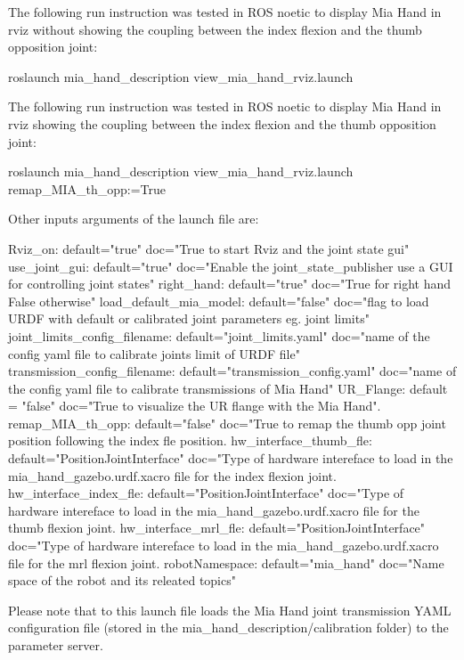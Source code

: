 The following run instruction was tested in R\+OS noetic to display Mia Hand in rviz without showing the coupling between the index flexion and the thumb opposition joint\+: \begin{DoxyVerb}roslaunch mia_hand_description view_mia_hand_rviz.launch
\end{DoxyVerb}


The following run instruction was tested in R\+OS noetic to display Mia Hand in rviz showing the coupling between the index flexion and the thumb opposition joint\+: \begin{DoxyVerb}roslaunch mia_hand_description view_mia_hand_rviz.launch remap_MIA_th_opp:=True
\end{DoxyVerb}


Other inputs arguments of the launch file are\+: \begin{DoxyVerb}Rviz_on:                          default="true"                      doc="True to start Rviz and the joint state gui"
use_joint_gui:                    default="true"                      doc="Enable the joint_state_publisher use a GUI for controlling joint states"
right_hand:                       default="true"                      doc="True for right hand False otherwise"
load_default_mia_model:           default="false"                     doc="flag to load URDF with default or calibrated joint parameters eg. joint limits"
joint_limits_config_filename:     default="joint_limits.yaml"         doc="name of the config yaml file to calibrate joints limit of URDF file"
transmission_config_filename:     default="transmission_config.yaml"  doc="name of the config yaml file to calibrate transmissions of Mia Hand"
UR_Flange:                        default = "false"                   doc="True to visualize the UR flange with the Mia Hand".
remap_MIA_th_opp:                 default="false"                     doc="True to remap the thumb opp joint position following the index fle position.
hw_interface_thumb_fle:           default="PositionJointInterface"    doc="Type of hardware intereface to load in the mia_hand_gazebo.urdf.xacro file for the index flexion joint.
hw_interface_index_fle:           default="PositionJointInterface"    doc="Type of hardware intereface to load in the mia_hand_gazebo.urdf.xacro file for the thumb flexion joint.
hw_interface_mrl_fle:             default="PositionJointInterface"    doc="Type of hardware intereface to load in the mia_hand_gazebo.urdf.xacro file for the mrl flexion joint.
robotNamespace:                   default="mia_hand"                  doc="Name space of the robot and its releated topics"
\end{DoxyVerb}


Please note that to this launch file loads the Mia Hand joint transmission Y\+A\+ML configuration file (stored in the mia\+\_\+hand\+\_\+description/calibration folder) to the parameter server. 